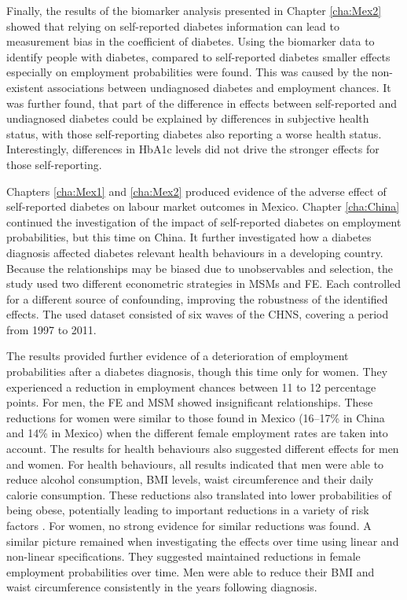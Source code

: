 Finally, the results of the biomarker analysis presented in Chapter \ref{cha:Mex2} showed that relying on self-reported diabetes information can lead to measurement bias in the coefficient of diabetes. Using the biomarker data to identify people with diabetes, compared to self-reported diabetes smaller effects especially on employment probabilities were found. This was caused by the non-existent associations between undiagnosed diabetes and employment chances. It was further found, that part of the difference in effects between self-reported and undiagnosed diabetes could be explained by differences in subjective health status, with those self-reporting diabetes also reporting a worse health status. Interestingly, differences in \ac{HbA1c} levels did not drive the stronger effects for those self-reporting. %

Chapters \ref{cha:Mex1} and \ref{cha:Mex2} produced evidence of the adverse effect of self-reported diabetes on labour market outcomes in Mexico. Chapter \ref{cha:China} continued the investigation of the impact of self-reported diabetes on employment probabilities, but this time on China. It further investigated how a diabetes diagnosis affected diabetes relevant health behaviours in a developing country. Because the relationships may be biased due to unobservables and selection, the study used two different econometric strategies in \acp{MSM} and \ac{FE}. Each controlled for a different source of confounding, improving the robustness of the identified effects. The used dataset consisted of six waves of the \ac{CHNS}, covering a period from 1997 to 2011.

The results provided further evidence of a deterioration of employment probabilities after a diabetes diagnosis, though this time only for women. They experienced a reduction in employment chances between 11 to 12 percentage points. For men, the \ac{FE} and \ac{MSM} showed insignificant relationships. These reductions for women were similar to those found in Mexico (16--17\% in China and 14\% in Mexico) when the different female employment rates are taken into account. The results for health behaviours also suggested different effects for men and women. For health behaviours, all results indicated that men were able to reduce alcohol consumption, \ac{BMI} levels, waist circumference and their daily calorie consumption. These reductions also translated into lower probabilities of being obese, potentially leading to important reductions in a variety of risk factors \parencite{Wilding2014}. For women, no strong evidence for similar reductions was found. A similar picture remained when investigating the effects over time using linear and non-linear specifications. They suggested maintained reductions in female employment probabilities over time. Men were able to reduce their \ac{BMI} and waist circumference consistently in the years following diagnosis.

